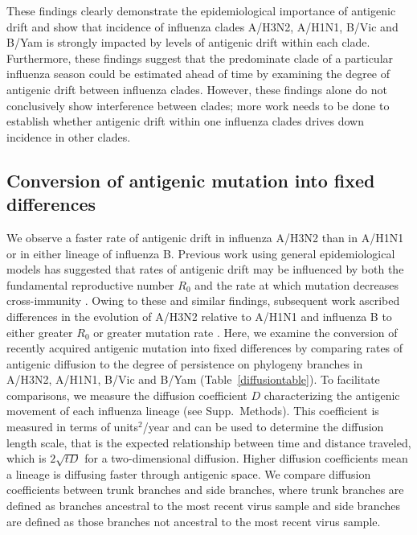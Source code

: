 \documentclass[11pt,oneside,letterpaper]{article}
\begin{document}
These findings clearly demonstrate the epidemiological importance of antigenic drift and show that incidence of influenza clades A/H3N2, A/H1N1, B/Vic and B/Yam is strongly impacted by levels of antigenic drift within each clade.
Furthermore, these findings suggest that the predominate clade of a particular influenza season could be estimated ahead of time by examining the degree of antigenic drift between influenza clades.
However, these findings alone do not conclusively show interference between clades; more work needs to be done to establish whether antigenic drift within one influenza clades drives down incidence in other clades.

\subsection*{Conversion of antigenic mutation into fixed differences}

We observe a faster rate of antigenic drift in influenza A/H3N2 than in A/H1N1 or in either lineage of influenza B.
Previous work using general epidemiological models has suggested that rates of antigenic drift may be influenced by both the fundamental reproductive number $R_0$ and the rate at which mutation decreases cross-immunity \cite{Gog02,Lin03}.
Owing to these and similar findings, subsequent work ascribed differences in the evolution of A/H3N2 relative to A/H1N1 and influenza B to either greater $R_0$ or greater mutation rate \cite{Ferguson03,Bedford12}.
Here, we examine the conversion of recently acquired antigenic mutation into fixed differences by comparing rates of antigenic diffusion to the degree of persistence on phylogeny branches in A/H3N2, A/H1N1, B/Vic and B/Yam (Table~\ref{diffusiontable}).
To facilitate comparisons, we measure the diffusion coefficient $D$ \cite{Pybus12} characterizing the antigenic movement of each influenza lineage (see Supp.\ Methods).
This coefficient is measured in terms of units$^2$/year and can be used to determine the diffusion length scale, that is the expected relationship between time and distance traveled, which is $2 \sqrt{t D}$ for a two-dimensional diffusion.
Higher diffusion coefficients mean a lineage is diffusing faster through antigenic space.
We compare diffusion coefficients between trunk branches and side branches, where trunk branches are defined as branches ancestral to the most recent virus sample and side branches are defined as those branches not ancestral to the most recent virus sample.
\end{document}
